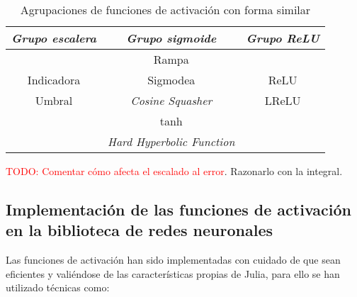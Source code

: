 \begin{table}[H] 
    \centering  
    \begin{tabular}{| c | c | c | }
        \hline
        \textit{Grupo escalera} & \textit{Grupo sigmoide} & \textit{Grupo ReLU} \\
        \hline
       &  Rampa &  \\
       Indicadora & Sigmodea & ReLU\\
       Umbral & \textit{Cosine Squasher}& LReLU\\
        & tanh & \\
        & \textit{Hard Hyperbolic Function}& \\
\hline
    \end{tabular}
    \caption{Agrupaciones de funciones de activación con forma similar}  
    \label{table:Clases-equivalencia-activation-function}
\end{table}

\textcolor{red}{TODO: Comentar cómo afecta el escalado al error}. Razonarlo con la integral.

\subsection{ Implementación de las funciones de activación en la biblioteca de redes neuronales} 

Las funciones de activación han sido implementadas con cuidado de que sean eficientes 
y valiéndose de las características propias de Julia, para ello se han utilizado técnicas como: 

